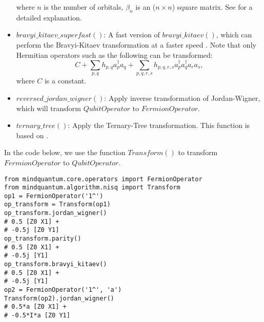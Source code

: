 \begin{itemize}
          where $n$ is the number of orbitals, $\beta_n$ is an ($n \times n$) square matrix. See \cite{seeley2012bravyi} for a detailed explanation.
    \item $bravyi\_kitaev\_superfast()$: A fast version of $bravyi\_kitaev()$, which can perform the Bravyi-Kitaev transformation at a faster speed \cite{setia2018bravyi}. Note that only Hermitian operators such as the following can be transformed:
          \begin{equation}
              C + \sum_{p,q} h_{p,q} a_p^{\dagger} a_q + \sum_{p,q,r,s} h_{p,q,r,s} a_p^{\dagger} a_q^{\dagger} a_r a_s,
          \end{equation}
          where $C$ is a constant.
    \item $reversed\_jordan\_wigner()$: Apply inverse transformation of Jordan-Wigner, which will transform $QubitOperator$ to $FermionOperator$.
    \item $ternary\_tree()$: Apply the Ternary-Tree transformation. This function is based on \cite{jiang2020optimal}.
\end{itemize}
In the code below, we use the function $Transform()$ to transform $FermionOperator$ to $QubitOperator$.
\begin{lstlisting}
from mindquantum.core.operators import FermionOperator
from mindquantum.algorithm.nisq import Transform
op1 = FermionOperator('1^')
op_transform = Transform(op1)
op_transform.jordan_wigner()
# 0.5 [Z0 X1] +
# -0.5j [Z0 Y1]
op_transform.parity()
# 0.5 [Z0 X1] +
# -0.5j [Y1]
op_transform.bravyi_kitaev()
# 0.5 [Z0 X1] +
# -0.5j [Y1]
op2 = FermionOperator('1^', 'a')
Transform(op2).jordan_wigner()
# 0.5*a [Z0 X1] +
# -0.5*I*a [Z0 Y1]
\end{lstlisting}